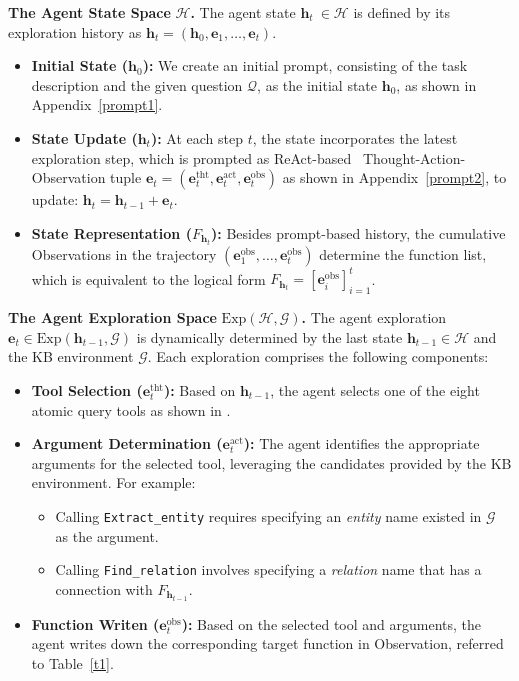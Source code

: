 \documentclass{article}
\theoremstyle{plain}
\theoremstyle{definition}
\theoremstyle{remark}
\begin{document}
\textbf{The Agent State Space} $\mathcal{H}$\textbf{.} 
The agent state $\mathbf{h}_t\ \in \mathcal{H}$ is defined by its exploration history as $\mathbf{h}_t = (\mathbf{h}_0, \mathbf{e}_1, \dots, \mathbf{e}_t)$.
\begin{itemize}
    \item \textbf{Initial State (}$\mathbf{h}_0$\textbf{):} We create an initial prompt, consisting of the task description and the given question $\mathcal{Q}$, as the initial state $\mathbf{h}_0$, as shown in Appendix~\ref{prompt1}.
    \item \textbf{State Update (}$\mathbf{h}_t$\textbf{):} At each step $t$, the state incorporates the latest exploration step, which is prompted as ReAct-based~\cite{ReAct} Thought-Action-Observation tuple $\mathbf{e}_t = (\mathbf{e}_t^{\text{tht}}, \mathbf{e}_t^{\text{act}}, \mathbf{e}_t^{\text{obs}})$ as shown in Appendix~\ref{prompt2}, to update: $\mathbf{h}_t=\mathbf{h}_{t-1}+\mathbf{e}_t$.
    \item \textbf{State Representation (}$F_{\mathbf{h}_t}$\textbf{):} Besides prompt-based history, the cumulative Observations in the trajectory $(\mathbf{e}_1^{\text{obs}}, \dots, \mathbf{e}_t^{\text{obs}})$ determine the function list, which is equivalent to the logical form $F_{\mathbf{h}_t} = [\mathbf{e}_i^{\text{obs}}]_{i=1}^t$.
\end{itemize}

\textbf{The Agent Exploration Space} $\text{Exp}(\mathcal{H},\mathcal{G})$\textbf{.} 
The agent exploration $\mathbf{e}_t \in \text{Exp}(\mathbf{h}_{t-1},\mathcal{G})$ is dynamically determined by the last state $\mathbf{h}_{t-1} \in \mathcal{H}$ and the KB environment $\mathcal{G}$. Each exploration comprises the following components:
\begin{itemize}
    \item \textbf{Tool Selection (}$\mathbf{e}_t^{\text{tht}}$\textbf{):} Based on $\mathbf{h}_{t-1}$, the agent selects one of the eight atomic query tools as shown in .
    \item \textbf{Argument Determination (}$\mathbf{e}_t^{\text{act}}$\textbf{):} The agent identifies the appropriate arguments for the selected tool, leveraging the candidates provided by the KB environment. For example:
    \begin{itemize}
        \item Calling \texttt{Extract\_entity} requires specifying an \textit{entity} name existed in $\mathcal{G}$ as the argument.
        \item Calling \texttt{Find\_relation} involves specifying a \textit{relation} name that has a connection with $F_{\mathbf{h}_{t-1}}$.
    \end{itemize}
    \item \textbf{Function Writen (}$\mathbf{e}_t^{\text{obs}}$\textbf{):} Based on the selected tool and arguments, the agent writes down the corresponding target function in Observation, referred to Table~\ref{t1}.
\end{itemize}
\end{document}
